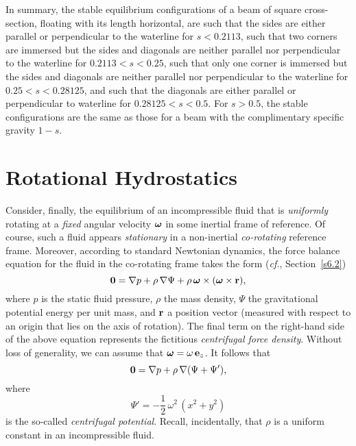 In summary, the stable equilibrium configurations of a beam of square cross-section, floating with its length horizontal, are such that
the sides are either parallel or perpendicular to the waterline for $s<0.2113$, such
that two corners are immersed but the  sides and diagonals are neither parallel nor perpendicular to the waterline for $0.2113<s<0.25$, such that only one corner is immersed but the
sides and diagonals are neither parallel nor perpendicular to the waterline for $0.25<s<0.28125$, and such that the diagonals are either parallel or perpendicular to waterline for $0.28125<s<0.5$. For $s>0.5$, the stable configurations are the same as those for a
beam with the complimentary specific gravity $1-s$. 

\section{Rotational Hydrostatics}
Consider, finally, the equilibrium of an  incompressible fluid that is {\em uniformly}\/ rotating at a
{\em fixed}\/ angular velocity $\mbox{\boldmath$\omega$}$ in some inertial  frame of reference. Of course,  such a fluid appears {\em stationary}\/ in a non-inertial {\em co-rotating}\/ reference frame. Moreover, according to standard Newtonian dynamics, the force balance equation for the fluid in the
co-rotating frame takes the form ({\em cf.}, Section~\ref{s6.2})
\begin{equation}\label{e8.1}
{\bf 0} = \nabla p + \rho\,\nabla\Psi + \rho\,\mbox{\boldmath$\omega$}\times (\mbox{\boldmath$\omega$}\times {\bf r}),
\end{equation}
where $p$ is the static fluid pressure, $\rho$ the mass density, $\Psi$ the gravitational potential energy
per unit mass, and ${\bf r}$ a position vector (measured with respect to an origin that lies on the
axis of rotation). The final term on the right-hand side of the above equation represents the fictitious {\em centrifugal force density}. 
Without loss of generality, we can assume that $\mbox{\boldmath$\omega$} = \omega\,{\bf e}_z$. It follows
that
\begin{equation}\label{e8.2}
{\bf 0} = \nabla p + \rho\,\nabla(\Psi+\Psi') ,
\end{equation}
where 
\begin{equation}\label{e8.3}
\Psi' = -\frac{1}{2}\,\omega^2\,(x^2+y^2)
\end{equation}
is the so-called {\em centrifugal potential}. 
Recall, incidentally, that $\rho$ is a uniform constant in an incompressible fluid.

